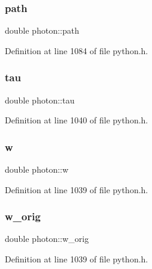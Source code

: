 \mbox{\label{structphoton_a3029350c63c7c27314adca143458c4ed}} 
\subsubsection{\texorpdfstring{path}{path}}
{\footnotesize\ttfamily double photon\+::path}



Definition at line 1084 of file python.\+h.

\mbox{\label{structphoton_ae42fbabbb99b92586f81ee793288ff35}} 
\subsubsection{\texorpdfstring{tau}{tau}}
{\footnotesize\ttfamily double photon\+::tau}



Definition at line 1040 of file python.\+h.

\mbox{\label{structphoton_a5fa87a07a9ceef33dd79aa5cdd7856cb}} 
\subsubsection{\texorpdfstring{w}{w}}
{\footnotesize\ttfamily double photon\+::w}



Definition at line 1039 of file python.\+h.

\mbox{\label{structphoton_a08790ef51ec6cc5d192173396080c9d9}} 
\subsubsection{\texorpdfstring{w\+\_\+orig}{w\_orig}}
{\footnotesize\ttfamily double photon\+::w\+\_\+orig}



Definition at line 1039 of file python.\+h.

\mbox{\label{structphoton_a279232990e041c1535ce72fdd34c359d}} 
